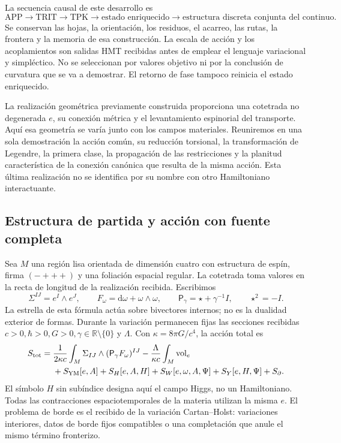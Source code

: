 La secuencia causal de este desarrollo es
\[
 \mathrm{APP}\longrightarrow\mathrm{TRIT}\longrightarrow\mathrm{TPK}
 \longrightarrow\text{estado enriquecido}
 \longrightarrow\text{estructura discreta conjunta del continuo}.
\]
Se conservan las hojas, la orientación, los residuos, el acarreo, las rutas,
la frontera y la memoria de esa construcción. La escala de acción y los
acoplamientos son salidas HMT recibidas antes de emplear el lenguaje
variacional y simpléctico. No se seleccionan por valores objetivo ni por
la conclusión de curvatura que se va a demostrar. El retorno de fase
tampoco reinicia el estado enriquecido.

La realización geométrica previamente construida proporciona una
cotetrada no degenerada \(e\), su conexión métrica y el levantamiento
espinorial del transporte. Aquí esa geometría se varía junto con los
campos materiales. Reuniremos en una sola demostración la acción común,
su reducción torsional, la transformación de Legendre, la primera clase,
la propagación de las restricciones y la planitud característica de la
conexión canónica que resulta de la misma acción. Esta última realización
no se identifica por su nombre con otro Hamiltoniano interactuante.

\subsection{Estructura de partida y acción con fuente completa}
\label{hmtcuatro:datos-accion-total}

Sea \(M\) una región lisa orientada de dimensión cuatro con estructura
de espín, firma \((-+++)\) y una foliación espacial regular. La cotetrada
toma valores en la recta de longitud de la realización recibida.
Escribimos
\[
 \Sigma^{IJ}=e^I\wedge e^J,\qquad
 F_\omega=\mathrm d\omega+\omega\wedge\omega,\qquad
 \mathsf P_\gamma=\star+\gamma^{-1}I,\qquad \star^2=-I.
\]
La estrella de esta fórmula actúa sobre bivectores internos; no es la
dualidad exterior de formas. Durante la variación permanecen fijas las
secciones recibidas \(c>0,\hbar>0,G>0,\gamma\in\mathbb R\setminus\{0\}\)
y \(\Lambda\). Con \(\kappa=8\pi G/c^4\), la acción total es
\begin{equation}
 \begin{split}
 S_{\rm tot}={}&\frac1{2\kappa c}
   \int_M\Sigma_{IJ}\wedge(\mathsf P_\gamma F_\omega)^{IJ}
 -\frac{\Lambda}{\kappa c}\int_M\operatorname{vol}_e\\
 &+S_{\rm YM}[e,A]+S_H[e,A,H]
   +S_W[e,\omega,A,\Psi]+S_Y[e,H,\Psi]+S_{\partial}.
 \end{split}
 \label{hmtcuatro:accion-total}
\end{equation}
El símbolo \(H\) sin subíndice designa aquí el campo Higgs, no un
Hamiltoniano. Todas las contracciones espaciotemporales de la materia
utilizan la misma \(e\). El problema de borde es el recibido de la
variación Cartan--Holst: variaciones interiores, datos de borde fijos
compatibles o una completación que anule el mismo término fronterizo.

